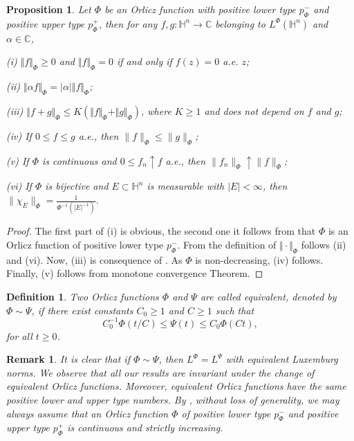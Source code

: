 \documentclass[oneside,10pt]{article}
\newtheorem{definition}[theorem]{Definition}
\newtheorem{proposition}[theorem]{Proposition}
\newtheorem{remark}[theorem]{Remark}
\begin{document}
\begin{proposition} \label{quasi-norm}
Let $\Phi$ be an Orlicz function with positive lower type $p_{\Phi}^{-}$ and positive upper type $p_{\Phi}^{+}$, then for any 
$f, g : \mathbb{H}^n \to \mathbb{C}$ belonging to $L^{\Phi}(\mathbb{H}^n)$ and $\alpha \in \mathbb{C}$,

(i) $\Vert f \Vert_{\Phi} \geq 0$ and $\Vert f \Vert_{\Phi} = 0$ if and only if $f(z) = 0$ a.e. $z$;

(ii) $\Vert \alpha f \Vert_{\Phi} = \vert \alpha \vert \Vert f \Vert_{\Phi}$;

(iii) $\Vert f + g \Vert_{\Phi} \leq K (\Vert f \Vert_{\Phi} + \Vert g \Vert_{\Phi})$, where $K \geq 1$ and does not depend on $f$ and $g$;

(iv) If $0 \leq f \leq g$ a.e., then $\| f \|_{\Phi} \leq \| g \|_{\Phi}$;

(v) If $\Phi$ is continuous and $0 \leq f_n \uparrow f$ a.e., then $\| f_n \|_{{\Phi}} \uparrow \| f \|_{{\Phi}}$;

(vi) If $\Phi$ is bijective and $E \subset \mathbb{H}^n$ is measurable with $|E| < \infty$, then 
$\| \chi_E  \|_{\Phi} = \frac{1}{\Phi^{-1}(|E|^{-1})}$.
\end{proposition}

\begin{proof} The first part of (i) is obvious, the second one it follows from that $\Phi$ is an Orlicz function of positive lower 
type $p_{\Phi}^{-}$. From the definition of $\Vert \cdot \Vert_{\Phi}$ follows (ii) and (vi). Now, (iii) is consequence of 
\cite[Lemma 2.3]{Zhang}. As $\Phi$ is non-decreasing, (iv) follows. Finally, (v) follows from monotone convergence Theorem.
\end{proof}


\begin{definition}
Two Orlicz functions $\Phi$ and $\Psi$ are called equivalent, denoted by $\Phi \sim \Psi$, if there exist constants $C_0 \geq 1$ and 
$C \geq 1$ such that
\[
C_{0}^{-1}\Phi(t/C) \leq \Psi(t) \leq C_0 \Phi(Ct),
\]
for all $t \geq 0$.
\end{definition}

\begin{remark} \label{cont and crec}
It is clear that if $\Phi \sim \Psi$, then $L^{\Phi} = L^{\Psi}$ with equivalent Luxemburg norms. We observe that all our results are 
invariant under the change of equivalent Orlicz functions. Moreover, equivalent Orlicz functions have the same positive lower and upper type numbers. By \cite[Lemma 2.5]{Zhang}, without loss of generality, we may always assume that an Orlicz function $\Phi$ of positive lower type $p_{\Phi}^{-}$ and positive upper type $p_{\Phi}^{+}$ is continuous and strictly increasing.
\end{remark}
\end{document}
